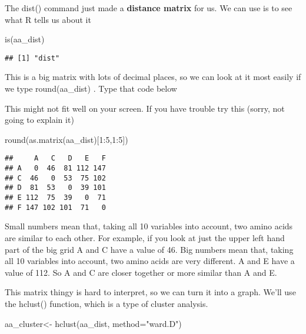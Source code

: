 \documentclass[
]{book}
\newenvironment{Shaded}{\begin{snugshade}}{\end{snugshade}}
\newcommand{\AttributeTok}[1]{\textcolor[rgb]{0.77,0.63,0.00}{#1}}
\newcommand{\DecValTok}[1]{\textcolor[rgb]{0.00,0.00,0.81}{#1}}
\newcommand{\FunctionTok}[1]{\textcolor[rgb]{0.00,0.00,0.00}{#1}}
\newcommand{\NormalTok}[1]{#1}
\newcommand{\OtherTok}[1]{\textcolor[rgb]{0.56,0.35,0.01}{#1}}
\newcommand{\SpecialCharTok}[1]{\textcolor[rgb]{0.00,0.00,0.00}{#1}}
\newcommand{\StringTok}[1]{\textcolor[rgb]{0.31,0.60,0.02}{#1}}
\begin{document}
The dist() command just made a \textbf{distance matrix} for us. We can use is to see what R tells us about it

\begin{Shaded}
\begin{Highlighting}[]
\FunctionTok{is}\NormalTok{(aa\_dist)}
\end{Highlighting}
\end{Shaded}

\begin{verbatim}
## [1] "dist"
\end{verbatim}

This is a big matrix with lots of decimal places, so we can look at it most easily if we type round(aa\_dist) . Type that code below

This might not fit well on your screen. If you have trouble try this (sorry, not going to explain it)

\begin{Shaded}
\begin{Highlighting}[]
\FunctionTok{round}\NormalTok{(}\FunctionTok{as.matrix}\NormalTok{(aa\_dist)[}\DecValTok{1}\SpecialCharTok{:}\DecValTok{5}\NormalTok{,}\DecValTok{1}\SpecialCharTok{:}\DecValTok{5}\NormalTok{])}
\end{Highlighting}
\end{Shaded}

\begin{verbatim}
##     A   C   D   E   F
## A   0  46  81 112 147
## C  46   0  53  75 102
## D  81  53   0  39 101
## E 112  75  39   0  71
## F 147 102 101  71   0
\end{verbatim}

Small numbers mean that, taking all 10 variables into account, two amino acids are similar to each other. For example, if you look at just the upper left hand part of the big grid A and C have a value of 46. Big numbers mean that, taking all 10 variables into account, two amino acids are very different. A and E have a value of 112. So A and C are closer together or more similar than A and E.

This matrix thingy is hard to interpret, so we can turn it into a graph. We'll use the hclust() function, which is a type of cluster analysis.

\begin{Shaded}
\begin{Highlighting}[]
\NormalTok{aa\_cluster}\OtherTok{\textless{}{-}} \FunctionTok{hclust}\NormalTok{(aa\_dist, }\AttributeTok{method=}\StringTok{"ward.D"}\NormalTok{)}
\end{Highlighting}
\end{Shaded}
\end{document}
